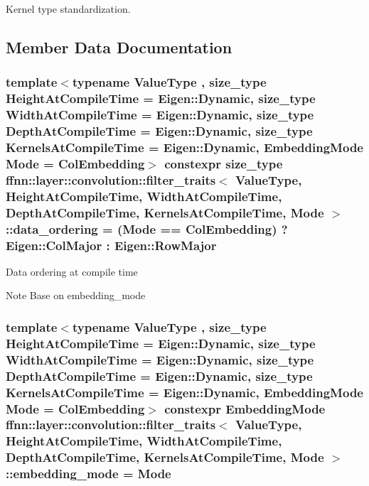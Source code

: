 Kernel type standardization. 



\subsection{Member Data Documentation}
\hypertarget{structffnn_1_1layer_1_1convolution_1_1filter__traits_a8ade103e54dc45f85bfea03c56470cd4}{
\subsubsection[{data\-\_\-ordering}]{\setlength{\rightskip}{0pt plus 5cm}template$<$typename Value\-Type , size\-\_\-type Height\-At\-Compile\-Time = Eigen\-::\-Dynamic, size\-\_\-type Width\-At\-Compile\-Time = Eigen\-::\-Dynamic, size\-\_\-type Depth\-At\-Compile\-Time = Eigen\-::\-Dynamic, size\-\_\-type Kernels\-At\-Compile\-Time = Eigen\-::\-Dynamic, Embedding\-Mode Mode = Col\-Embedding$>$ constexpr {\bf size\-\_\-type} {\bf ffnn\-::layer\-::convolution\-::filter\-\_\-traits}$<$ Value\-Type, Height\-At\-Compile\-Time, Width\-At\-Compile\-Time, Depth\-At\-Compile\-Time, Kernels\-At\-Compile\-Time, Mode $>$\-::data\-\_\-ordering = (Mode == {\bf Col\-Embedding}) ? Eigen\-::\-Col\-Major \-: Eigen\-::\-Row\-Major\hspace{0.3cm}{\ttfamily [static]}}}\label{structffnn_1_1layer_1_1convolution_1_1filter__traits_a8ade103e54dc45f85bfea03c56470cd4}
Data ordering at compile time \begin{DoxyNote}{Note}
Base on embedding\-\_\-mode 
\end{DoxyNote}
\hypertarget{structffnn_1_1layer_1_1convolution_1_1filter__traits_af84215067c426f2a9bb8c6fd4bd87363}{
\subsubsection[{embedding\-\_\-mode}]{\setlength{\rightskip}{0pt plus 5cm}template$<$typename Value\-Type , size\-\_\-type Height\-At\-Compile\-Time = Eigen\-::\-Dynamic, size\-\_\-type Width\-At\-Compile\-Time = Eigen\-::\-Dynamic, size\-\_\-type Depth\-At\-Compile\-Time = Eigen\-::\-Dynamic, size\-\_\-type Kernels\-At\-Compile\-Time = Eigen\-::\-Dynamic, Embedding\-Mode Mode = Col\-Embedding$>$ constexpr {\bf Embedding\-Mode} {\bf ffnn\-::layer\-::convolution\-::filter\-\_\-traits}$<$ Value\-Type, Height\-At\-Compile\-Time, Width\-At\-Compile\-Time, Depth\-At\-Compile\-Time, Kernels\-At\-Compile\-Time, Mode $>$\-::embedding\-\_\-mode = Mode\hspace{0.3cm}{\ttfamily [static]}}}\label{structffnn_1_1layer_1_1convolution_1_1filter__traits_af84215067c426f2a9bb8c6fd4bd87363}


